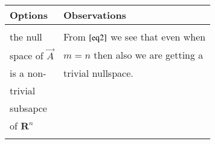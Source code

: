 \documentclass[journal,12pt,twocolumn]{IEEEtran}
\begin{document}
	\begin{table}[hp]
		\begin{tabular}{|l|l|}
			\hline
			Options & Observations\\
			\hline
			& \\
			the null & From $\eqref{eq2}$ we see that even when \\ 
			space of $\vec{A}$ & $m = n$ then also we are getting a \\
			is a non-& trivial nullspace. \\
			trivial & \\
			subsapce & \\
			of $\mathbf{R}^{n}$ & \\\documentclass[journal,12pt,twocolumn]{IEEEtran}
			\usepackage{setspace}
			\usepackage{gensymb}
			\usepackage{siunitx}
			\usepackage{tkz-euclide} 
			\usepackage{textcomp}
			\usepackage{standalone}
			\usetikzlibrary{calc}
			
			\singlespacing
			
			\usepackage[cmex10]{amsmath}
			\usepackage{amsthm}
			\usepackage{mathrsfs}
			\usepackage{txfonts}
			\usepackage{stfloats}
			\usepackage{bm}
			\usepackage{cite}
			\usepackage{cases}
			\usepackage{subfig}
			\usepackage{longtable}
			\usepackage{multirow}
			\usepackage{enumitem}
			\usepackage{mathtools}
			\usepackage{steinmetz}
			\usepackage{tikz}
			\usepackage{circuitikz}
			\usepackage{verbatim}
			\usepackage{tfrupee}
			\usepackage[breaklinks=true]{hyperref}
			\usepackage{tkz-euclide} %
			\usetikzlibrary{calc,math}
			\usepackage{listings}
			\usepackage{color}                                            %
			\usepackage{array}                                            %
			\usepackage{longtable}                                        %
			\usepackage{calc}                                             %
			\usepackage{multirow}                                         %
			\usepackage{hhline}                                           %
			\usepackage{ifthen}                                           %
			\usepackage{lscape}     
			\usepackage{multicol}
			\usepackage{chngcntr}
			\usepackage{amsmath}
			\usepackage{cleveref}
			

\end{tabular}
\end{table}
\end{document}
